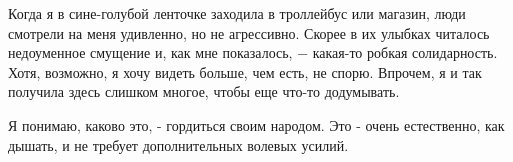 Когда я в сине-голубой ленточке заходила в троллейбус или магазин, люди
смотрели на меня удивленно, но не агрессивно. Скорее в их улыбках читалось
недоуменное смущение и, как мне показалось, − какая-то робкая солидарность.
Хотя, возможно, я хочу видеть больше, чем есть, не спорю. Впрочем, я и так
получила здесь слишком многое, чтобы еще что-то додумывать.

Я понимаю, каково это, - гордиться своим народом. Это - очень естественно, как
дышать, и не требует дополнительных волевых усилий.

